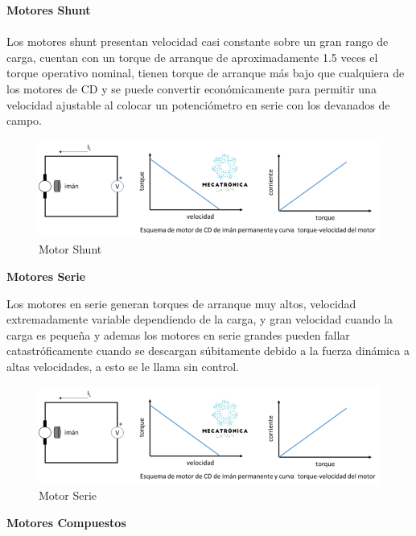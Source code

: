 \documentclass[12pt]{report}
\begin{document}
{\huge \textbf{Motores Shunt }\\}\\

{\Large Los motores shunt presentan velocidad casi constante sobre un gran rango de carga, cuentan con un torque de arranque de aproximadamente 1.5 veces el torque operativo nominal, tienen torque de arranque más bajo que cualquiera de los motores de CD y se puede convertir económicamente para permitir una velocidad ajustable al colocar un potenciómetro en serie con los devanados de campo.}\\
\begin{figure}[hbtp]
\centering
\includegraphics[scale=.5]{../EV_2_4_giro_de_un_motor_de_corriente_directa/curva-motor-de-iman-permanente.png}
\caption{Motor Shunt}
\end{figure}


{\huge \textbf{Motores Serie }\\}


{\Large  Los motores en serie generan torques de arranque muy altos, velocidad extremadamente variable dependiendo de la carga, y gran velocidad cuando la carga es pequeña y ademas los motores en serie grandes pueden fallar catastróficamente cuando se descargan súbitamente debido a la fuerza dinámica a altas velocidades, a esto se le llama sin control. }\\
\begin{figure}[hbtp]
\centering
\includegraphics[scale=0.5]{../EV_2_4_giro_de_un_motor_de_corriente_directa/curva-motor-de-iman-permanente.png}
\caption{Motor Serie}
\end{figure}

\newpage
{\huge \textbf{Motores Compuestos }\\}
\end{document}
